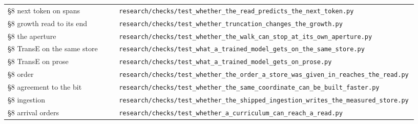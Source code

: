 \documentclass[10pt,letterpaper,twocolumn]{article}
\begin{document}
\begin{center}
{\begin{xtabular}{L{0.276\linewidth}L{0.655\linewidth}}
§8 next token on spans & \texttt{research/\allowbreak{}checks/\allowbreak{}test\_\allowbreak{}whether\_\allowbreak{}the\_\allowbreak{}read\_\allowbreak{}predicts\_\allowbreak{}the\_\allowbreak{}next\_\allowbreak{}token.\allowbreak{}py} \\
§8 growth read to its end & \texttt{research/\allowbreak{}checks/\allowbreak{}test\_\allowbreak{}whether\_\allowbreak{}truncation\_\allowbreak{}changes\_\allowbreak{}the\_\allowbreak{}growth.\allowbreak{}py} \\
§8 the aperture & \texttt{research/\allowbreak{}checks/\allowbreak{}test\_\allowbreak{}whether\_\allowbreak{}the\_\allowbreak{}walk\_\allowbreak{}can\_\allowbreak{}stop\_\allowbreak{}at\_\allowbreak{}its\_\allowbreak{}own\_\allowbreak{}aperture.\allowbreak{}py} \\
§8 TransE on the same store & \texttt{research/\allowbreak{}checks/\allowbreak{}test\_\allowbreak{}what\_\allowbreak{}a\_\allowbreak{}trained\_\allowbreak{}model\_\allowbreak{}gets\_\allowbreak{}on\_\allowbreak{}the\_\allowbreak{}same\_\allowbreak{}store.\allowbreak{}py} \\
§8 TransE on prose & \texttt{research/\allowbreak{}checks/\allowbreak{}test\_\allowbreak{}what\_\allowbreak{}a\_\allowbreak{}trained\_\allowbreak{}model\_\allowbreak{}gets\_\allowbreak{}on\_\allowbreak{}prose.\allowbreak{}py} \\
§8 order & \texttt{research/\allowbreak{}checks/\allowbreak{}test\_\allowbreak{}whether\_\allowbreak{}the\_\allowbreak{}order\_\allowbreak{}a\_\allowbreak{}store\_\allowbreak{}was\_\allowbreak{}given\_\allowbreak{}in\_\allowbreak{}reaches\_\allowbreak{}the\_\allowbreak{}read.\allowbreak{}py} \\
§8 agreement to the bit & \texttt{research/\allowbreak{}checks/\allowbreak{}test\_\allowbreak{}whether\_\allowbreak{}the\_\allowbreak{}same\_\allowbreak{}coordinate\_\allowbreak{}can\_\allowbreak{}be\_\allowbreak{}built\_\allowbreak{}faster.\allowbreak{}py} \\
§8 ingestion & \texttt{research/\allowbreak{}checks/\allowbreak{}test\_\allowbreak{}whether\_\allowbreak{}the\_\allowbreak{}shipped\_\allowbreak{}ingestion\_\allowbreak{}writes\_\allowbreak{}the\_\allowbreak{}measured\_\allowbreak{}store.\allowbreak{}py} \\
§8 arrival orders & \texttt{research/\allowbreak{}checks/\allowbreak{}test\_\allowbreak{}whether\_\allowbreak{}a\_\allowbreak{}curriculum\_\allowbreak{}can\_\allowbreak{}reach\_\allowbreak{}a\_\allowbreak{}read.\allowbreak{}py} \\

\end{xtabular}}
\end{center}
\end{document}
